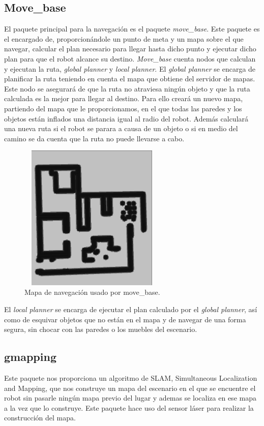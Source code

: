 \subsection{Move\_base}
\label{sec:movebase}
El paquete principal para la navegación es el paquete \textit{move\_base}\footnotemark. Este paquete es el encargado de, proporcionándole un punto de meta y un mapa sobre el que navegar, calcular el plan necesario para llegar hasta dicho punto y ejecutar dicho plan para que el robot alcance su destino. \textit{Move\_base} cuenta nodos que calculan y ejecutan la ruta, \textit{global planner} y \textit{local planner}. El \textit{global planner} se encarga de planificar la ruta teniendo en cuenta el mapa que obtiene del servidor de mapas. Este nodo se asegurará de que la ruta no atraviesa ningún objeto y que la ruta calculada es la mejor para llegar al destino. Para ello creará un nuevo mapa, partiendo del mapa que le proporcionamos, en el que todas las paredes y los objetos están inflados una distancia igual al radio del robot. Además calculará una nueva ruta si el robot se parara a causa de un objeto o si en medio del camino se da cuenta que la ruta no puede llevarse a cabo.
\begin{figure}[H]
  \begin{center}
    \includegraphics[width=7cm,height=7cm]{img/cap3/movebase}
  \end{center}
  \caption{Mapa de navegación usado por move\_base.}
  \label{fig:movebasemap}
\end{figure}



El \textit{local planner} se encarga de ejecutar el plan calculado por el \textit{global planner}, así como de esquivar objetos que no están en el mapa y de navegar de una forma segura, sin chocar con las paredes o los muebles del escenario.

\subsection{gmapping}
\label{sec:gmapping}
Este paquete nos proporciona un algoritmo de SLAM, Simultaneous Localization and Mapping, que nos construye un mapa del escenario en el que se encuentre el robot sin pasarle ningún mapa previo del lugar y ademas se localiza en ese mapa a la vez que lo construye. Este paquete hace uso del sensor láser para realizar la construcción del mapa.
